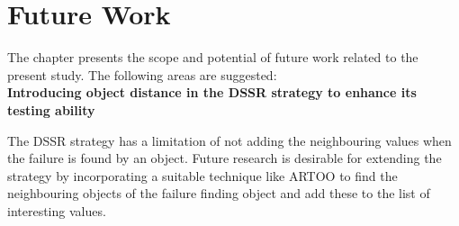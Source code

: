 
\chapter{Future Work}
\label{chap:futureWork}
The chapter presents the scope and potential of future work related to the present study. The following areas are suggested:\\


	
\textbf{Introducing object distance in the DSSR strategy to enhance its testing ability}

The DSSR strategy has a limitation of not adding the neighbouring values when the failure is found by an object. Future research is desirable for extending the strategy by incorporating a suitable technique like ARTOO to find the neighbouring objects of the failure finding object and add these to the list of interesting values.  


